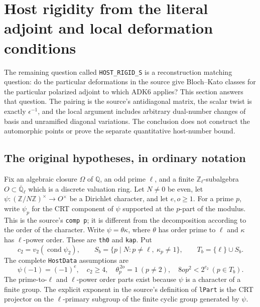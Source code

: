 \documentclass[11pt,a4paper]{article}
\numberwithin{equation}{section}
\theoremstyle{remark}\newtheorem{remark}[theorem]{Remark}
\begin{document}
\section{Host rigidity from the literal adjoint and local deformation conditions}
\label{sec:host-rigidity-v42}

The remaining question called \texttt{HOST\_\allowbreak RIGID\_\allowbreak S} is a
reconstruction matching question: do the particular deformations in
the source give Bloch--Kato classes for the particular polarized
adjoint to which ADK6 applies?  This section answers that question.
The pairing is the source's antidiagonal matrix, the scalar twist is
exactly $\epsilon^{-1}$, and the local argument includes arbitrary
dual-number changes of basis and unramified diagonal variations.
The conclusion does not construct the automorphic points or prove
the separate quantitative host-number bound.

\subsection{The original hypotheses, in ordinary notation}

Fix an algebraic closure $\Omega$ of $\mathbb Q$, an odd prime
$\ell$, and a finite $\mathbb Z_\ell$-subalgebra
$O\subset\overline{\mathbb Q}_\ell$ which is a discrete valuation
ring.  Let $N\ne0$ be even, let
$\psi:(\mathbb Z/N\mathbb Z)^\times\to O^\times$ be a Dirichlet
character, and let $e,\allowbreak{} o\ge1$.  For a prime $p$, write $\psi_p$ for
the CRT component of $\psi$ supported at the $p$-part of the modulus.
This is the source's \texttt{comp p}; it is different from the
decomposition according to the order of the character.  Write
$\psi=\theta\kappa$, where $\theta$ has order prime to $\ell$
and $\kappa$ has $\ell$-power order.  These are
\texttt{th0} and \texttt{kap}.  Put
\[
 c_2=v_2(\operatorname{cond}\psi_2),\qquad
 S_b=\{p\mid N:p\ne\ell,\ \kappa_p\ne1\},\qquad
 T_b=\{\ell\}\cup S_b.
 \tag{HSR.1}
\]
The complete \texttt{Host\allowbreak Data} assumptions are
\[
 \psi(-1)=(-1)^e,\quad c_2\ge4,\quad
 \theta_p^{\,2o}=1\ (p\ne2),\quad
 8op^2<2^{c_2}\ (p\in T_b).
 \tag{HSR.2}
\]
The prime-to-$\ell$ and $\ell$-power order parts exist because
$\psi$ is a character of a finite group.  The explicit exponent
in the source's definition of \texttt{l\allowbreak Part} is the CRT projector
on the $\ell$-primary subgroup of the finite cyclic group generated
by $\psi$.
\end{document}
